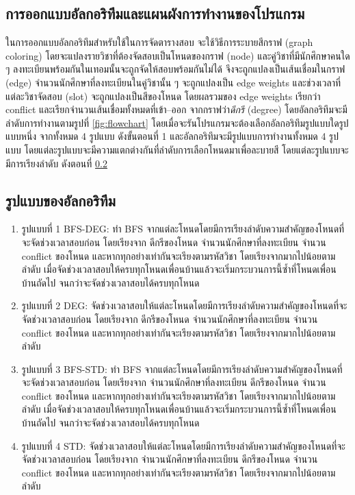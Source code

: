 \subsection{การออกแบบอัลกอริทึมและแผนผังการทำงานของโปรแกรม}
ในการออกแบบอัลกอริทึมสำหรับใช้ในการจัดตารางสอบ จะใช้วิธีการระบายสีกราฟ (graph coloring) 
โดยจะแปลงรายวิชาที่ต้องจัดสอบเป็นโหนดของกราฟ (node) 
และคู่วิชาที่มีนักศึกษาคนใด ๆ ลงทะเบียนพร้อมกันในเทอมนั้นจะถูกจัดให้สอบพร้อมกันไม่ได้ 
จึงจะถูกแปลงเป็นเส้นเชื่อมในกราฟ (edge) จำนวนนักศึกษาที่ลงทะเบียนในคู่วิชานั้น ๆ จะถูกแปลงเป็น edge weights
และช่วงเวลาที่แต่ละวิชาจัดสอบ (slot) จะถูกแปลงเป็นสีของโหนด
โดยผลรวมของ edge weights เรียกว่า conflict
และเรียกจำนวนเส้นเชื่อมทั้งหมดที่เข้า--ออก จากกราฟว่า\emph{ดีกรี} (degree) 
โดยอัลกอริทึมจะมีลำดับการทำงานตามรูปที่ \ref{fig:flowchart} 
โดยเมื่อจะรันโปรแกรมจะต้องเลือกอัลกอริทึมรูปแบบใดรูปแบบหนึ่ง จากทั้งหมด 4 รูปแบบ ดังขั้นตอนที่ 1
และอัลกอริทึมจะมีรูปแบบการทำงานทั้งหมด 4 รูปแบบ โดยแต่ละรูปแบบจะมีความแตกต่างกันที่ลำดับการเลือกโหนดมาเพื่อละบายสี
โดยแต่ละรูปแบบจะมีการเรียงลำดับ ดังตอนที่ \ref{subsec:sorting_type}

\subsection{รูปแบบของอัลกอริทึม}
\label{subsec:sorting_type}
\begin{enumerate}
  \item รูปแบบที่ 1 BFS-DEG: ทำ BFS จากแต่ละโหนดโดยมีการเรียงลำดับความสำคัญของโหนดที่จะจัดช่วงเวลาสอบก่อน โดยเรียงจาก
  ดีกรีของโหนด จำนวนนักศึกษาที่ลงทะเบียน จำนวน conflict ของโหนด และหากทุกอย่างเท่ากันจะเรียงตามรหัสวิชา โดยเรียงจากมากไปน้อยตามลำดับ
  เมื่อจัดช่วงเวลาสอบให้ครบทุกโหนดเพื่อนบ้านแล้วจะเริ่มกระบวนการนี้ซ้ำที่โหนดเพื่อนบ้านถัดไป จนกว่าจะจัดช่วงเวลาสอบได้ครบทุกโหนด
  \item รูปแบบที่ 2 DEG: จัดช่วงเวลาสอบให้แต่ละโหนดโดยมีการเรียงลำดับความสำคัญของโหนดที่จะจัดช่วงเวลาสอบก่อน โดยเรียงจาก
  ดีกรีของโหนด จำนวนนักศึกษาที่ลงทะเบียน จำนวน conflict ของโหนด และหากทุกอย่างเท่ากันจะเรียงตามรหัสวิชา โดยเรียงจากมากไปน้อยตามลำดับ
  \item รูปแบบที่ 3 BFS-STD: ทำ BFS จากแต่ละโหนดโดยมีการเรียงลำดับความสำคัญของโหนดที่จะจัดช่วงเวลาสอบก่อน โดยเรียงจาก
  จำนวนนักศึกษาที่ลงทะเบียน ดีกรีของโหนด จำนวน conflict ของโหนด และหากทุกอย่างเท่ากันจะเรียงตามรหัสวิชา โดยเรียงจากมากไปน้อยตามลำดับ
  เมื่อจัดช่วงเวลาสอบให้ครบทุกโหนดเพื่อนบ้านแล้วจะเริ่มกระบวนการนี้ซ้ำที่โหนดเพื่อนบ้านถัดไป จนกว่าจะจัดช่วงเวลาสอบได้ครบทุกโหนด
  \item รูปแบบที่ 4 STD: จัดช่วงเวลาสอบให้แต่ละโหนดโดยมีการเรียงลำดับความสำคัญของโหนดที่จะจัดช่วงเวลาสอบก่อน โดยเรียงจาก
  จำนวนนักศึกษาที่ลงทะเบียน ดีกรีของโหนด จำนวน conflict ของโหนด และหากทุกอย่างเท่ากันจะเรียงตามรหัสวิชา โดยเรียงจากมากไปน้อยตามลำดับ
\end{enumerate}


